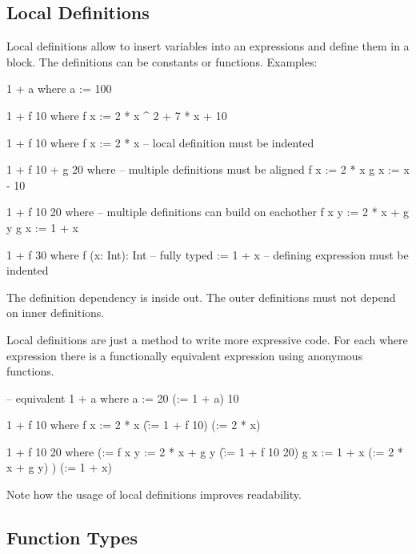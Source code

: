 \subsection{Local Definitions}


Local definitions allow to insert variables into an expressions and define them
in a  block. The definitions can be constants or functions.
%
%
Examples:
\begin{alba}
    1 + a where a := 100

    1 + f 10 where f x := 2 * x ^ 2 + 7 * x + 10

    1 + f 10 where
        f x := 2 * x            -- local definition must be indented

    1 + f 10 + g 20 where       -- multiple definitions must be aligned
        f x := 2 * x
        g x := x - 10

    1 + f 10 20 where           -- multiple definitions can build on eachother
        f x y := 2 * x + g y
        g x := 1 + x

    1 + f 30 where
        f (x: Int): Int         -- fully typed
        :=
            1 + x               -- defining expression must be indented
\end{alba}

The definition dependency is inside out. The outer definitions must not depend
on inner definitions.

Local definitions are just a method to write more expressive code. For each
where expression there is a functionally equivalent expression using anonymous
functions.

\begin{alba}
                                        -- equivalent
    1 + a where a := 20                 (\a := 1 + a) 10

    1 + f 10 where f x := 2 * x         (\f := 1 + f 10) (\x := 2 * x)

    1 + f 10 20 where                   (\g :=
        f x y := 2 * x + g y                (\f := 1 + f 10 20)
        g x := 1 + x                            (\x := 2 * x + g y)
                                        ) (\x := 1 + x)
\end{alba}
%
Note how the usage of local definitions improves readability.










\vskip 5mm
\subsection{Function Types}



